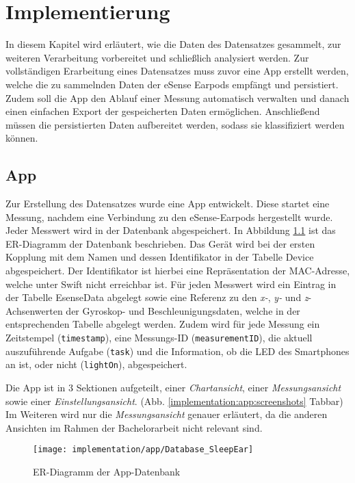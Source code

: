 \chapter{Implementierung}
\label{ch:Implementierung}

In diesem Kapitel wird erläutert, wie die Daten des Datensatzes gesammelt, zur weiteren Verarbeitung vorbereitet und schließlich analysiert werden.
Zur vollständigen Erarbeitung eines Datensatzes muss zuvor eine App erstellt werden, welche die zu sammelnden Daten der eSense Earpods empfängt und persistiert. 
Zudem soll die App den Ablauf einer Messung automatisch verwalten und danach einen einfachen Export der gespeicherten Daten ermöglichen.
Anschließend müssen die persistierten Daten aufbereitet werden, sodass sie klassifiziert werden können.

\section{App}
\label{ch:Implementierung:app}
Zur Erstellung des Datensatzes wurde eine App entwickelt.
Diese startet eine Messung, nachdem eine Verbindung zu den eSense-Earpods hergestellt wurde.
Jeder Messwert wird in der Datenbank abgespeichert.
In Abbildung \ref{implementation:app:erModel} ist das ER-Diagramm der Datenbank beschrieben.
Das Gerät wird bei der ersten Kopplung mit dem Namen und dessen Identifikator in der Tabelle {\glqq Device\grqq} abgespeichert.
Der Identifikator ist hierbei eine Repräsentation der MAC-Adresse, welche unter Swift nicht erreichbar ist.
Für jeden Messwert wird ein Eintrag in der Tabelle {\glqq EsenseData\grqq} abgelegt sowie eine Referenz zu den \textit{x-}, \textit{y-} und \textit{z}-Achsenwerten der Gyroskop- und Beschleunigungsdaten, welche in der entsprechenden Tabelle abgelegt werden.
Zudem wird für jede Messung ein Zeitstempel (\texttt{timestamp}), eine Messungs-ID (\texttt{measurementID}), die aktuell auszuführende Aufgabe (\texttt{task}) und die Information, ob die LED des Smartphones an ist, oder nicht (\texttt{lightOn}), abgespeichert.

Die App ist in 3 Sektionen aufgeteilt, einer \textit{Chartansicht}, einer \textit{Messungsansicht} sowie einer \textit{Einstellungsansicht}. 
(Abb. \ref{implementation:app:screenshots} Tabbar)
Im Weiteren wird nur die \textit{Messungsansicht} genauer erläutert, da die anderen Ansichten im Rahmen der Bachelorarbeit nicht relevant sind.

\begin{figure}[ht]
  \centering
  \texttt{[image: implementation/app/Database\_SleepEar]}
  \caption{ER-Diagramm der App-Datenbank}
  \label{implementation:app:erModel}
\end{figure}

